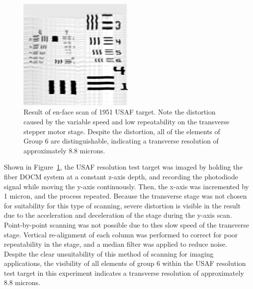 \begin{figure}[h!]
\centering
\includegraphics[width=0.5\textwidth]{Images/Results/en-face-usaf.png}
\caption[Result of en-face scan of USAF target.]{Result of en-face scan of 1951 USAF target. Note the distortion caused by the variable speed and low repeatability on the transverse stepper motor stage. Despite the distortion, all of the elements of Group 6 are distinguishable, indicating a transverse resolution of approximately 8.8 microns.\label{fig:usaf_oct}}
\end{figure}

Shown in Figure~\ref{fig:usaf_oct}, the USAF resolution test target was imaged by holding the fiber DOCM system at a constant z-axis depth, and recording the photodiode signal while moving the y-axis continuously. Then, the x-axis was incremented by 1 micron, and the process repeated. Because the transverse stage was not chosen for suitability for this type of scanning, severe distortion is visible in the result due to the acceleration and deceleration of the stage during the y-axis scan. Point-by-point scanning was not possible due to thes slow speed of the transverse stage. Vertical re-alignment of each column was performed to correct for poor repeatability in the stage, and a median filter was applied to reduce noise. Despite the clear unsuitability of this method of scanning for imaging applications, the visibility of all elements of group 6 within the USAF resolution test target in this experiment indicates a transverse resolution of approximately 8.8 microns.

